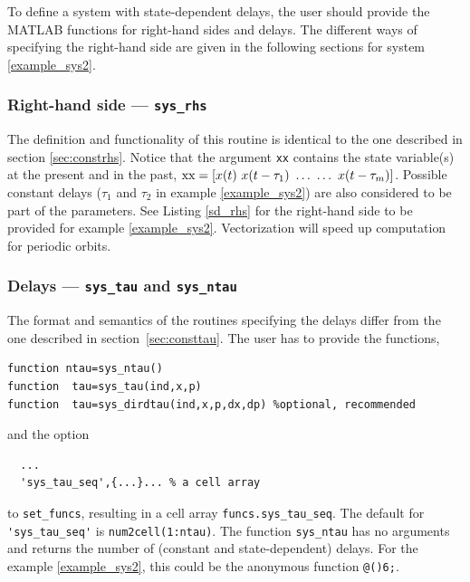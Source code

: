 \documentclass[10pt]{scrartcl}
\newcommand{\blist}[1]{\mbox{\lstinline!#1!}}
\begin{document}
To define a system with state-dependent delays, the user should
provide the MATLAB functions for right-hand sides and delays. The
different ways of specifying the right-hand side are given in the
following sections for system \eqref{example_sys2}.


\subsubsection{Right-hand side --- \texorpdfstring{\blist{sys_rhs}}{sys\_rhs}}
\label{sec:sdrhs}
The definition and functionality of this routine is identical to the
one described in section \ref{sec:constrhs}.  Notice that the argument
\blist{xx} contains the state variable(s) at the present and in the
past, $\blist{xx}=[x(t)\ x(t-\tau_1)\ \ldots\ \ldots\ x(t-\tau_m)]$.
Possible constant delays ($\tau_1$ and $\tau_2$ in example
\eqref{example_sys2}) are also considered to be part of the
parameters. See Listing \ref{sd_rhs} for the right-hand side to be
provided for example \eqref{example_sys2}. Vectorization will speed up
computation for periodic orbits.


\subsubsection{Delays --- \texorpdfstring{\blist{sys_tau}}{sys\_tau} and \texorpdfstring{\blist{sys_ntau}}{sys\_ntau}}
\label{sec:sdtau}
The format and semantics of the routines specifying the delays differ
from the one described in section~\ref{sec:consttau}. The user has to provide the functions,
\begin{lstlisting}
function ntau=sys_ntau()        
function  tau=sys_tau(ind,x,p)
function  tau=sys_dirdtau(ind,x,p,dx,dp) %optional, recommended
\end{lstlisting}
and the option
\begin{lstlisting}
  ...
  'sys_tau_seq',{...}... % a cell array
\end{lstlisting}
to \blist{set_funcs}, resulting in a cell array \blist{funcs.sys_tau_seq}. The default for
\blist{'sys_tau_seq'} is \blist{num2cell(1:ntau)}.  The function
\blist{sys_ntau} has no arguments and returns the number of (constant
and state-dependent) delays. For the example \eqref{example_sys2},
this could be the anonymous function \blist{@()6;}.
\end{document}
